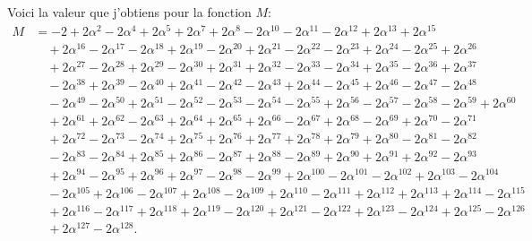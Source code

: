 \documentclass[12pt,a4paper]{article}
\theoremstyle{definition}
\begin{document}
Voici la valeur que j'obtiens pour la fonction $M$:
\begin{align*}
M &= -2 + 2\alpha^2 - 2\alpha^4 + 2\alpha^5 + 2\alpha^7 + 2\alpha^8 - 2\alpha^{10} - 2\alpha^{11} - 2\alpha^{12} + 2\alpha^{13} + 2\alpha^{15} \\
&\quad + 2\alpha^{16} - 2\alpha^{17} - 2\alpha^{18} + 2\alpha^{19} - 2\alpha^{20} + 2\alpha^{21} - 2\alpha^{22} - 2\alpha^{23} + 2\alpha^{24} - 2\alpha^{25} + 2\alpha^{26} \\
&\quad + 2\alpha^{27} - 2\alpha^{28} + 2\alpha^{29} - 2\alpha^{30} + 2\alpha^{31} + 2\alpha^{32} - 2\alpha^{33} - 2\alpha^{34} + 2\alpha^{35} - 2\alpha^{36} + 2\alpha^{37} \\
&\quad - 2\alpha^{38} + 2\alpha^{39} - 2\alpha^{40} + 2\alpha^{41} - 2\alpha^{42} - 2\alpha^{43} + 2\alpha^{44} - 2\alpha^{45} + 2\alpha^{46} - 2\alpha^{47} - 2\alpha^{48} \\
&\quad - 2\alpha^{49} - 2\alpha^{50} + 2\alpha^{51} - 2\alpha^{52} - 2\alpha^{53} - 2\alpha^{54} - 2\alpha^{55} + 2\alpha^{56} - 2\alpha^{57} - 2\alpha^{58} - 2\alpha^{59} + 2\alpha^{60} \\
&\quad + 2\alpha^{61} + 2\alpha^{62} - 2\alpha^{63} + 2\alpha^{64} + 2\alpha^{65} + 2\alpha^{66} - 2\alpha^{67} + 2\alpha^{68} - 2\alpha^{69} + 2\alpha^{70} - 2\alpha^{71} \\
&\quad + 2\alpha^{72} - 2\alpha^{73} - 2\alpha^{74} + 2\alpha^{75} + 2\alpha^{76} + 2\alpha^{77} + 2\alpha^{78} + 2\alpha^{79} + 2\alpha^{80} - 2\alpha^{81} - 2\alpha^{82} \\
&\quad - 2\alpha^{83} - 2\alpha^{84} + 2\alpha^{85} + 2\alpha^{86} - 2\alpha^{87} + 2\alpha^{88} - 2\alpha^{89} + 2\alpha^{90} + 2\alpha^{91} + 2\alpha^{92} - 2\alpha^{93} \\
&\quad + 2\alpha^{94} - 2\alpha^{95} + 2\alpha^{96} + 2\alpha^{97} - 2\alpha^{98} - 2\alpha^{99} + 2\alpha^{100} - 2\alpha^{101} - 2\alpha^{102} + 2\alpha^{103} - 2\alpha^{104} \\
&\quad - 2\alpha^{105} + 2\alpha^{106} - 2\alpha^{107} + 2\alpha^{108} - 2\alpha^{109} + 2\alpha^{110} - 2\alpha^{111} + 2\alpha^{112} + 2\alpha^{113} + 2\alpha^{114} - 2\alpha^{115} \\
&\quad + 2\alpha^{116} - 2\alpha^{117} + 2\alpha^{118} + 2\alpha^{119} - 2\alpha^{120} + 2\alpha^{121} - 2\alpha^{122} + 2\alpha^{123} - 2\alpha^{124} + 2\alpha^{125} - 2\alpha^{126} \\
&\quad + 2\alpha^{127} - 2\alpha^{128}.
\end{align*}
\end{document}
